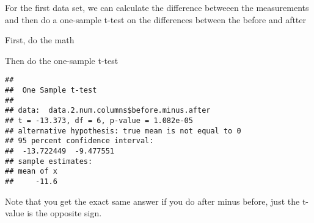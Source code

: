 \documentclass[
]{book}
\newenvironment{Shaded}{\begin{snugshade}}{\end{snugshade}}
\newcommand{\AttributeTok}[1]{\textcolor[rgb]{0.77,0.63,0.00}{#1}}
\newcommand{\DecValTok}[1]{\textcolor[rgb]{0.00,0.00,0.81}{#1}}
\newcommand{\FloatTok}[1]{\textcolor[rgb]{0.00,0.00,0.81}{#1}}
\newcommand{\FunctionTok}[1]{\textcolor[rgb]{0.00,0.00,0.00}{#1}}
\newcommand{\NormalTok}[1]{#1}
\newcommand{\OtherTok}[1]{\textcolor[rgb]{0.56,0.35,0.01}{#1}}
\newcommand{\SpecialCharTok}[1]{\textcolor[rgb]{0.00,0.00,0.00}{#1}}
\begin{document}
For the first data set, we can calculate the difference betweeen the measurements and then do a one-sample t-test on the differences between the before and aftter

First, do the math

\begin{Shaded}
\end{Shaded}

Then do the one-sample t-test

\begin{Shaded}
\end{Shaded}

\begin{verbatim}
## 
##  One Sample t-test
## 
## data:  data.2.num.columns$before.minus.after
## t = -13.373, df = 6, p-value = 1.082e-05
## alternative hypothesis: true mean is not equal to 0
## 95 percent confidence interval:
##  -13.722449  -9.477551
## sample estimates:
## mean of x 
##     -11.6
\end{verbatim}

Note that you get the exact same answer if you do after minus before, just the t-value is the opposite sign.

\begin{Shaded}
\end{Shaded}
\end{document}
